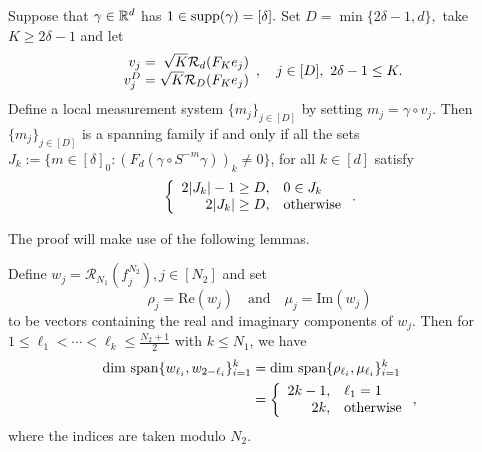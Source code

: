 
\begin{proposition}
  Suppose that $\gamma \in \mathbb{R}^d$ has $1 \in \operatorname{supp}(\gamma) = [\delta].$  Set $D = \min\{2 \delta - 1, d\},$ take $K \ge 2 \delta - 1$ and let \[\begin{array}{r@{\;=\;}r}v_j & \sqrt{K} \mathcal{R}_d(F_K e_j) \\ v_j^D & \sqrt{K} \mathcal{R}_D(F_K e_j) \end{array},\quad j \in [D],\  2 \delta - 1 \le K.\]  Define a local measurement system  $\{m_j\}_{j \in [D]}$ by setting $m_j = \gamma \circ v_j$.  Then $\{m_j\}_{j \in [D]}$ is a spanning family if and only if all the sets $J_k := \{m \in [\delta]_0 : (F_d (\gamma \circ S^{-m} \gamma))_k \neq 0\}$, for all $k \in [d]$ satisfy \[\left\{\begin{array}{r@{,\quad}l} 2 |J_k| - 1 \ge D & 0 \in J_k \\ 2 |J_k| \ge D & \text{otherwise}\end{array}\right..\] \label{prop:spanning_family}
\end{proposition}


The proof will make use of the following lemmas.

\begin{lemma}
  Define $w_j = \mathcal{R}_{N_1}(f_j^{N_2}), j \in [N_2]$ and set \[\rho_j = \mathrm{Re}(w_j) \quad\text{and}\quad \mu_j = \mathrm{Im}(w_j)\] to be vectors containing the real and imaginary components of $w_j$.  Then for $1 \le \ell_1 < \cdots < \ell_k \le \frac{N_2 + 1}{2}$ with $k \le N_1$, we have \begin{align*} \dim\,\Span\{w_{\ell_i}, w_{2 - \ell_i}\}_{i = 1}^k &= \dim\,\Span\{\rho_{\ell_i}, \mu_{\ell_i}\}_{i = 1}^k \\ &= \left\{\begin{array}{r@{,\quad}l} 2k - 1 & \ell_1 = 1 \\ 2k & \text{otherwise}\end{array}\right.,\end{align*} where the indices are taken modulo $N_2$. \label{lem:conjugate_span_dim}
\end{lemma}

